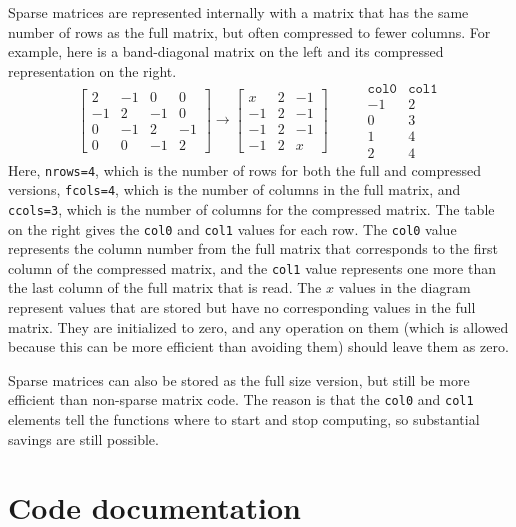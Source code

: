\documentclass[11pt]{article}
\newcommand {\ttt} {\texttt}
\begin{document}
Sparse matrices are represented internally with a matrix that has the same number of rows as the full matrix, but often compressed to fewer columns. For example, here is a band-diagonal matrix on the left and its compressed representation on the right.
$$\left[ \begin{array}{cccc}
2 & -1 & 0 & 0\\
-1 & 2 & -1 & 0\\
0 & -1 & 2 & -1 \\
0 & 0 & -1 & 2
\end{array} \right] \rightarrow
\left[ \begin{array}{ccc}
x & 2 & -1\\
-1 & 2 & -1\\
-1 & 2 & -1 \\
-1 & 2 & x
\end{array} \right] \hspace{1cm}
\begin{array}{cc}
\ttt{col0} & \ttt{col1} \\ \hline
-1 & 2\\
0 & 3\\
1 & 4 \\
2 & 4
\end{array}
$$
Here, \ttt{nrows=4}, which is the number of rows for both the full and compressed versions, \ttt{fcols=4}, which is the number of columns in the full matrix, and \ttt{ccols=3}, which is the number of columns for the compressed matrix. The table on the right gives the \ttt{col0} and \ttt{col1} values for each row. The \ttt{col0} value represents the column number from the full matrix that corresponds to the first column of the compressed matrix, and the \ttt{col1} value represents one more than the last column of the full matrix that is read. The $x$ values in the diagram represent values that are stored but have no corresponding values in the full matrix. They are initialized to zero, and any operation on them (which is allowed because this can be more efficient than avoiding them) should leave them as zero.

Sparse matrices can also be stored as the full size version, but still be more efficient than non-sparse matrix code. The reason is that the \ttt{col0} and \ttt{col1} elements tell the functions where to start and stop computing, so substantial savings are still possible.


\section{Code documentation}
\end{document}
